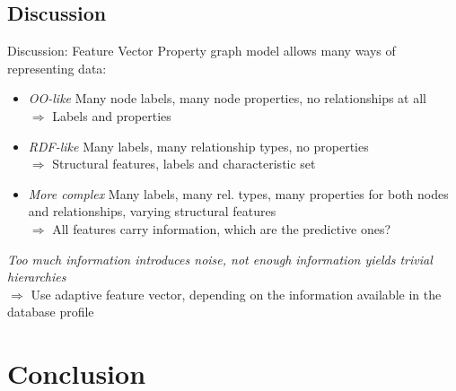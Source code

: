 \documentclass[rgb]{beamer}
\begin{document}
    \subsection{Discussion}
        \begin{frame}{Discussion: Feature Vector}
        Property graph model allows many ways of representing data: \\ \vspace{0.2cm}
            \begin{itemize}
                \item \textit{OO-like} Many node labels, many node properties, no relationships at all \\
                $\Rightarrow$ Labels and properties \\ \vspace{0.3cm}
                \item \textit{RDF-like} Many labels, many relationship types, no properties \\ 
                $\Rightarrow$ Structural features, labels and characteristic set \\ \vspace{0.3cm}
                \item \textit{More complex} Many labels, many rel. types, many properties for both nodes and relationships, varying structural features \\ 
                $\Rightarrow$ All features carry information, which are the predictive ones? \\ \vspace{0.3cm}
            \end{itemize}
            \textit{Too much information introduces noise, not enough information yields trivial hierarchies} \\
            $\Rightarrow$ \alert{Use adaptive feature vector, depending on the information available in the database profile}
    \end{frame}
    
\section{Conclusion}
\end{document}
